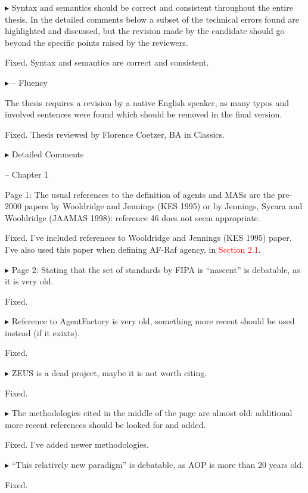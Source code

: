 \documentclass{article}
\newcommand*\R[1]{\textcolor{red}{#1}} %
\newenvironment{them}%
  {\bigskip\noindent\begingroup\color{blue}$\blacktriangleright$\enspace}%
  {\endgroup\par}
\begin{document}
\begin{them}
Syntax and semantics should be correct and consistent throughout the entire
thesis. In the detailed comments below a subset of the technical errors found
are highlighted and discussed, but the revision made by the candidate should go
beyond the specific points raised by the reviewers.
\end{them}
Fixed. Syntax and semantics are correct and consistent.

\begin{them}
-- Fluency

The thesis requires a revision by a native English speaker, as many typos and
involved sentences were found which should be removed in the final version.
\end{them}
Fixed. Thesis reviewed by Florence Coetzer, BA in Classics.

\begin{them}
Detailed Comments

-- Chapter 1

Page 1:
The usual references to the definition of agents and MASs are the pre-2000
papers by Wooldridge and Jennings (KES 1995) or by Jennings, Sycara and
Wooldridge (JAAMAS 1998): reference 46 does not seem appropriate.
\end{them}
Fixed. I've included references to Wooldridge and Jennings (KES 1995) paper.
I've also used this paper when defining AF-Raf agency, in \R{Section 2.1}.

\begin{them}
Page 2:
Stating that the set of standards by FIPA is ``nascent'' is debatable, as it is
very old.
\end{them}
Fixed.

\begin{them}
Reference to AgentFactory is very old, something more recent should be used
instead (if it exixts).
\end{them}
Fixed.

\begin{them}
ZEUS is a dead project, maybe it is not worth citing.
\end{them}
Fixed.

\begin{them}
The methodologies cited in the middle of the page are almost old: additional
more recent references should be looked for and added.
\end{them}
Fixed. I've added newer methodologies.

\begin{them}
``This relatively new paradigm'' is debatable, as AOP is more than 20 years old.
\end{them}
Fixed.
\end{document}

